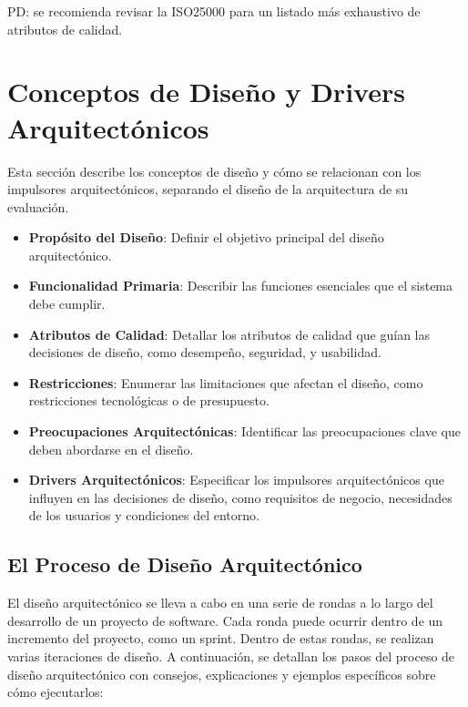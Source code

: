 PD: se recomienda revisar la ISO25000 para un listado más exhaustivo de atributos de calidad.

\section{Conceptos de Diseño y Drivers Arquitectónicos}

Esta sección describe los conceptos de diseño y cómo se relacionan con los impulsores arquitectónicos, separando el diseño de la arquitectura de su evaluación.

\begin{itemize}
\item \textbf{Propósito del Diseño}: Definir el objetivo principal del diseño arquitectónico.
\item \textbf{Funcionalidad Primaria}: Describir las funciones esenciales que el sistema debe cumplir.
\item \textbf{Atributos de Calidad}: Detallar los atributos de calidad que guían las decisiones de diseño, como desempeño, seguridad, y usabilidad.
\item \textbf{Restricciones}: Enumerar las limitaciones que afectan el diseño, como restricciones tecnológicas o de presupuesto.
\item \textbf{Preocupaciones Arquitectónicas}: Identificar las preocupaciones clave que deben abordarse en el diseño.
\item \textbf{Drivers Arquitectónicos}: Especificar los impulsores arquitectónicos que influyen en las decisiones de diseño, como requisitos de negocio, necesidades de los usuarios y condiciones del entorno.
\end{itemize}





\subsection{El Proceso de Diseño Arquitectónico}

El diseño arquitectónico se lleva a cabo en una serie de rondas a lo largo del desarrollo de un proyecto de software. Cada ronda puede ocurrir dentro de un incremento del proyecto, como un sprint. Dentro de estas rondas, se realizan varias iteraciones de diseño. A continuación, se detallan los pasos del proceso de diseño arquitectónico con consejos, explicaciones y ejemplos específicos sobre cómo ejecutarlos:

